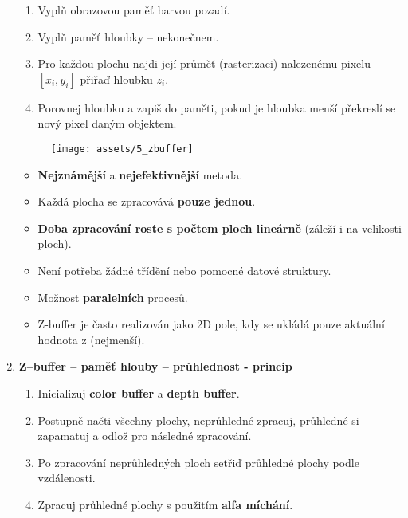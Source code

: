 \begin{enumerate}
\begin{enumerate}
              \item Vyplň obrazovou paměť barvou pozadí.
              \item Vyplň paměť hloubky -- nekonečnem.
              \item Pro každou plochu najdi její průměť (rasterizaci) nalezenému pixelu $[x_i,y_i]$ přiřaď hloubku $z_i$.
              \item Porovnej hloubku a zapiš do paměti, pokud je hloubka menší překreslí se nový pixel daným objektem.
          \end{enumerate}
          \begin{figure}[H]
              \centering
              \texttt{[image: assets/5\_zbuffer]}
          \end{figure}
          \begin{itemize}
              \item \textbf{Nejznámější} a \textbf{nejefektivnější} metoda.
              \item Každá plocha se zpracovává \textbf{pouze jednou}.
              \item \textbf{Doba zpracování roste s počtem ploch lineárně} (záleží i na velikosti ploch).
              \item Není potřeba žádné třídění nebo pomocné datové struktury.
              \item Možnost \textbf{paralelních} procesů.
              \item Z-buffer je často realizován jako 2D pole, kdy se ukládá pouze aktuální hodnota z (nejmenší).
          \end{itemize}
    \item \textbf{Z--buffer -- paměť hlouby -- průhlednost - princip}
          \begin{enumerate}
              \item Inicializuj \textbf{color buffer} a \textbf{depth buffer}.
              \item Postupně načti všechny plochy, neprůhledné zpracuj, průhledné si zapamatuj a odlož pro následné zpracování.
              \item Po zpracování neprůhledných ploch setřiď průhledné plochy podle vzdálenosti.
              \item Zpracuj průhledné plochy s použitím \textbf{alfa míchání}.
          \end{enumerate}
\end{enumerate}
